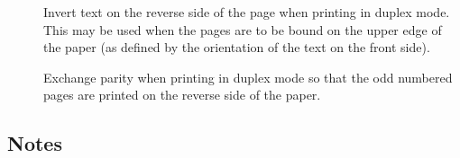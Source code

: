 \begin{description}
\item[]
   Invert text on the reverse side of the page when printing in duplex mode.
   This may be used when the pages are to be bound on the upper edge of the
   paper (as defined by the orientation of the text on the front side).

\item[]
   Exchange parity when printing in duplex mode so that the odd numbered pages
   are printed on the reverse side of the paper.

\end{description}

\subsection*{Notes}


